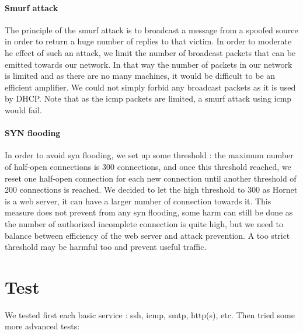 \documentclass[a4paper,titlepage]{article}
\begin{document}
\paragraph{Smurf attack}
The principle of the smurf attack is to broadcast a message from a spoofed source in order to return a huge number of replies to that victim.
In order to moderate he effect of such an attack, we limit the number of broadcast packets that can be emitted towards our network. In that way the number of packets in our network is limited and as there are no many machines, it would be difficult to be an efficient amplifier.
We could not simply forbid any broadcast packets as it is used by DHCP. Note that as the icmp packets are limited, a smurf attack using icmp would fail.

\paragraph{SYN flooding}
In order to avoid syn flooding, we set up some threshold : the maximum number of half-open connections is 300 connections, and once this threshold reached, we reset one half-open connection for each new connection until another threshold of 200 connections is reached. We decided to let the high threshold to 300 as Hornet is a web server, it can have a larger number of connection towards it. This measure does not prevent from any syn flooding, some harm can still be done as the number of authorized incomplete connection is quite high, but we need to balance between efficiency of the web server and attack prevention. A too strict threshold may be harmful too and prevent useful traffic.

\section{Test}
We tested first each basic service : ssh, icmp, smtp, http(s), etc. Then tried some more advanced tests:
\end{document}
